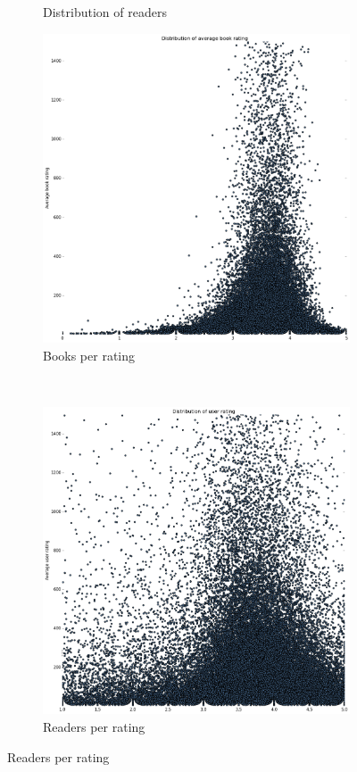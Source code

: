 \documentclass[11pt]{article}
\begin{document}
\begin{figure}
\begin{subfigure}[b]{0.6\textwidth}
                \caption{Distribution of readers}
        \end{subfigure}

        \begin{subfigure}[b]{0.6\textwidth}
                \includegraphics[width=\textwidth]{images/book_scatter_1500}
                \caption{Books per rating}
        \end{subfigure}%
        ~ %
        \begin{subfigure}[b]{0.6\textwidth}
                \includegraphics[width=\textwidth]{images/user_scatter_1500}
                \caption{Readers per rating}
        \end{subfigure}


\end{figure}
\end{document}
